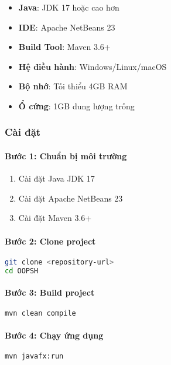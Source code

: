 \documentclass[12pt,a4paper]{article}
\begin{document}
\begin{itemize}
    \item \textbf{Java}: JDK 17 hoặc cao hơn
    \item \textbf{IDE}: Apache NetBeans 23
    \item \textbf{Build Tool}: Maven 3.6+
    \item \textbf{Hệ điều hành}: Windows/Linux/macOS
    \item \textbf{Bộ nhớ}: Tối thiểu 4GB RAM
    \item \textbf{Ổ cứng}: 1GB dung lượng trống
\end{itemize}

\subsubsection{Cài đặt}

\paragraph{Bước 1: Chuẩn bị môi trường}
\begin{enumerate}
    \item Cài đặt Java JDK 17
    \item Cài đặt Apache NetBeans 23
    \item Cài đặt Maven 3.6+
\end{enumerate}

\paragraph{Bước 2: Clone project}
\begin{lstlisting}[language=bash, caption=Lệnh clone project]
git clone <repository-url>
cd OOPSH
\end{lstlisting}

\paragraph{Bước 3: Build project}
\begin{lstlisting}[language=bash, caption=Lệnh build project]
mvn clean compile
\end{lstlisting}

\paragraph{Bước 4: Chạy ứng dụng}
\begin{lstlisting}[language=bash, caption=Lệnh chạy ứng dụng]
mvn javafx:run
\end{lstlisting}
\end{document}
